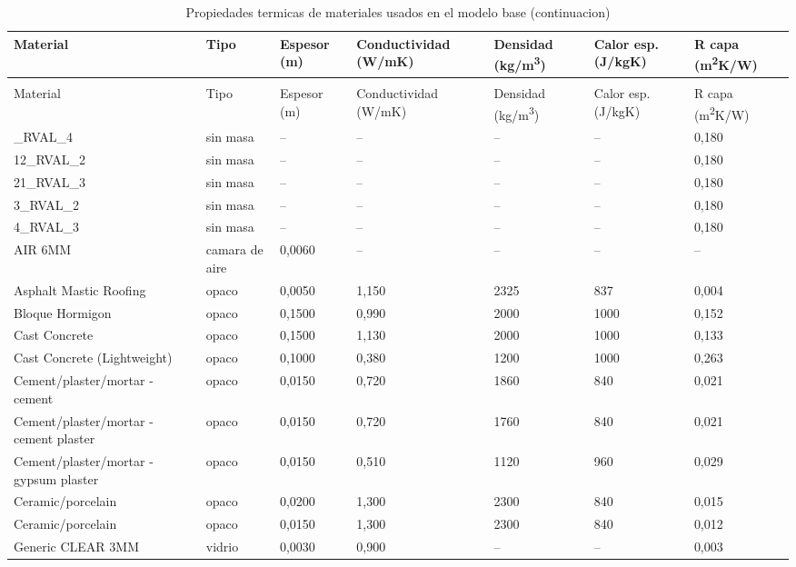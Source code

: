 {\fontsize{8}{10}\selectfont
\begin{longtable}{p{3.2cm}p{1.9cm}p{1.4cm}p{1.6cm}p{1.5cm}p{1.7cm}p{1.5cm}}
  \caption{Propiedades termicas de materiales usados en el modelo base} \\
  \toprule
  Material & Tipo & Espesor (m) & Conductividad (W/mK) & Densidad (kg/m\textsuperscript{3}) & Calor esp. (J/kgK) & R capa (m\textsuperscript{2}K/W) \\
  \midrule
  \endfirsthead
  \caption[]{Propiedades termicas de materiales usados en el modelo base (continuacion)} \\
  \toprule
  Material & Tipo & Espesor (m) & Conductividad (W/mK) & Densidad (kg/m\textsuperscript{3}) & Calor esp. (J/kgK) & R capa (m\textsuperscript{2}K/W) \\
  \midrule
  \endhead
  \bottomrule
  \endfoot
  11\_RVAL\_4 & sin masa & -- & -- & -- & -- & 0,180 \\
  12\_RVAL\_2 & sin masa & -- & -- & -- & -- & 0,180 \\
  21\_RVAL\_3 & sin masa & -- & -- & -- & -- & 0,180 \\
  3\_RVAL\_2 & sin masa & -- & -- & -- & -- & 0,180 \\
  4\_RVAL\_3 & sin masa & -- & -- & -- & -- & 0,180 \\
  AIR 6MM & camara de aire & 0,0060 & -- & -- & -- & -- \\
  Asphalt Mastic Roofing & opaco & 0,0050 & 1,150 & 2325 & 837 & 0,004 \\
  Bloque Hormigon & opaco & 0,1500 & 0,990 & 2000 & 1000 & 0,152 \\
  Cast Concrete & opaco & 0,1500 & 1,130 & 2000 & 1000 & 0,133 \\
  Cast Concrete (Lightweight) & opaco & 0,1000 & 0,380 & 1200 & 1000 & 0,263 \\
  Cement/plaster/mortar - cement & opaco & 0,0150 & 0,720 & 1860 & 840 & 0,021 \\
  Cement/plaster/mortar - cement plaster & opaco & 0,0150 & 0,720 & 1760 & 840 & 0,021 \\
  Cement/plaster/mortar - gypsum plaster & opaco & 0,0150 & 0,510 & 1120 & 960 & 0,029 \\
  Ceramic/porcelain & opaco & 0,0200 & 1,300 & 2300 & 840 & 0,015 \\
  Ceramic/porcelain & opaco & 0,0150 & 1,300 & 2300 & 840 & 0,012 \\
  Generic CLEAR 3MM & vidrio & 0,0030 & 0,900 & -- & -- & 0,003 \\

\end{longtable}}

